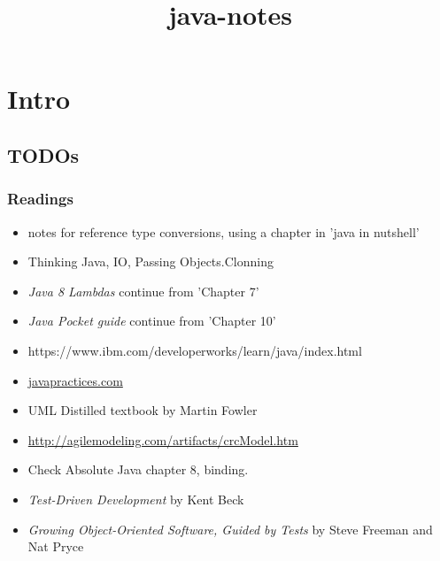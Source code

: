 \documentclass{report}
\title{java-notes}
\begin{document}
\tableofcontents




\part{Intro}



\chapter{TODOs}

\section{Readings}
\begin{itemize}
	\item  notes for reference type conversions, using a chapter in 'java in nutshell'
	\item Thinking Java, IO, Passing Objects.Clonning
	\item \textit{Java 8 Lambdas} continue from 'Chapter 7'
	\item \textit{Java Pocket guide} continue from  'Chapter 10'
	\item https://www.ibm.com/developerworks/learn/java/index.html
  	\item \href{http://www.javapractices.com/home/HomeAction.do;jsessionid=30B15108A7091DF24625AA7794107BE8} 
      {javapractices.com}
      
	\item UML Distilled textbook by Martin Fowler 
	\item \url{http://agilemodeling.com/artifacts/crcModel.htm}
	\item  Check Absolute Java chapter 8, binding.
	\item \textit{Test-Driven Development} by Kent Beck
	\item \textit{Growing Object-Oriented Software, Guided by Tests} by Steve Freeman and Nat Pryce 
\end{itemize}
\end{document}
